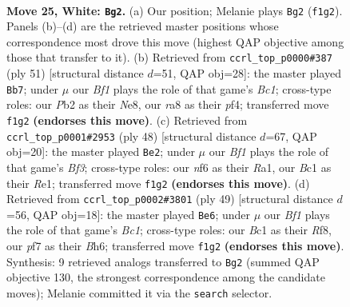 \documentclass[11pt]{article}
\begin{document}
\clearpage

\begin{figure}[p]\centering
\begin{subfigure}{0.46\textwidth}\centering
\resizebox{\linewidth}{!}{%
\newchessgame
\chessboard[
  setfen={r3k2r/5p2/b4n2/p2p4/4p2p/7P/PP1K1P2/R1B2B1R w kq - 0 25},
  showmover=false,
  pgfstyle=straightmove, color=movearrow, markmove={f1-g2}
]}
\caption{}
\end{subfigure}\hfill
\begin{subfigure}{0.46\textwidth}\centering
\resizebox{\linewidth}{!}{%
\newchessgame
\chessboard[
  setfen={r1b1nk1r/5p2/p6p/1p1p1B2/5P2/2P3N1/PP3R1P/3R3K b - - 0 26},
  showmover=false,
  pgfstyle=straightmove, color=movearrow, markmove={c8-b7}
]}
\caption{}
\end{subfigure}
\\[4pt]
\begin{subfigure}{0.46\textwidth}\centering
\resizebox{\linewidth}{!}{%
\newchessgame
\chessboard[
  setfen={2rr2k1/5pp1/1p3n1p/p2b4/P4B2/5B1P/1P3PP1/R3R1K1 w - - 2 25},
  showmover=false,
  pgfstyle=straightmove, color=movearrow, markmove={f3-e2}
]}
\caption{}
\end{subfigure}\hfill
\begin{subfigure}{0.46\textwidth}\centering
\resizebox{\linewidth}{!}{%
\newchessgame
\chessboard[
  setfen={1rb2r1k/6pp/B2p3b/3Np3/1P2p2P/2P5/5PP1/R3K2R b KQ - 0 25},
  showmover=false,
  pgfstyle=straightmove, color=movearrow, markmove={c8-e6}
]}
\caption{}
\end{subfigure}
\caption{\textbf{Move 25, White: \texttt{Bg2}.} (a) Our position; Melanie plays \texttt{Bg2} (\texttt{f1g2}). Panels (b)--(d) are the retrieved master positions whose correspondence most drove this move (highest QAP objective among those that transfer to it). (b) Retrieved from \texttt{ccrl\_top\_p0000\#387} (ply 51) [structural distance $d$=51, QAP obj=28]: the master played \texttt{Bb7}; under $\mu$ our \emph{Bf1} plays the role of that game's \emph{Bc1}; cross-type roles: our \emph{P}b2 as their \emph{N}e8, our \emph{r}a8 as their \emph{p}f4; transferred move \texttt{f1g2} \textbf{(endorses this move)}. (c) Retrieved from \texttt{ccrl\_top\_p0001\#2953} (ply 48) [structural distance $d$=67, QAP obj=20]: the master played \texttt{Be2}; under $\mu$ our \emph{Bf1} plays the role of that game's \emph{Bf3}; cross-type roles: our \emph{n}f6 as their \emph{R}a1, our \emph{B}c1 as their \emph{R}e1; transferred move \texttt{f1g2} \textbf{(endorses this move)}. (d) Retrieved from \texttt{ccrl\_top\_p0002\#3801} (ply 49) [structural distance $d$=56, QAP obj=18]: the master played \texttt{Be6}; under $\mu$ our \emph{Bf1} plays the role of that game's \emph{Bc1}; cross-type roles: our \emph{B}c1 as their \emph{R}f8, our \emph{p}f7 as their \emph{B}h6; transferred move \texttt{f1g2} \textbf{(endorses this move)}. Synthesis: 9 retrieved analogs transferred to \texttt{Bg2} (summed QAP objective 130, the strongest correspondence among the candidate moves); Melanie committed it via the \texttt{search} selector.}
\label{fig:thought-m48}
\end{figure}
\end{document}

